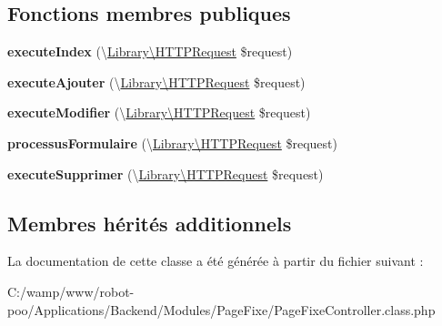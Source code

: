 \subsection*{Fonctions membres publiques}
\begin{DoxyCompactItemize}
\item 
\hypertarget{class_applications_1_1_backend_1_1_modules_1_1_page_fixe_1_1_page_fixe_controller_ac9c6fe801e9ac09e4a395ad64c76ed04}{{\bfseries execute\+Index} (\textbackslash{}\hyperlink{class_library_1_1_h_t_t_p_request}{Library\textbackslash{}\+H\+T\+T\+P\+Request} \$request)}\label{class_applications_1_1_backend_1_1_modules_1_1_page_fixe_1_1_page_fixe_controller_ac9c6fe801e9ac09e4a395ad64c76ed04}

\item 
\hypertarget{class_applications_1_1_backend_1_1_modules_1_1_page_fixe_1_1_page_fixe_controller_adf056b6997127e682bbd4ae668d0a247}{{\bfseries execute\+Ajouter} (\textbackslash{}\hyperlink{class_library_1_1_h_t_t_p_request}{Library\textbackslash{}\+H\+T\+T\+P\+Request} \$request)}\label{class_applications_1_1_backend_1_1_modules_1_1_page_fixe_1_1_page_fixe_controller_adf056b6997127e682bbd4ae668d0a247}

\item 
\hypertarget{class_applications_1_1_backend_1_1_modules_1_1_page_fixe_1_1_page_fixe_controller_ae86ff917aafe384e7fb46673719cba62}{{\bfseries execute\+Modifier} (\textbackslash{}\hyperlink{class_library_1_1_h_t_t_p_request}{Library\textbackslash{}\+H\+T\+T\+P\+Request} \$request)}\label{class_applications_1_1_backend_1_1_modules_1_1_page_fixe_1_1_page_fixe_controller_ae86ff917aafe384e7fb46673719cba62}

\item 
\hypertarget{class_applications_1_1_backend_1_1_modules_1_1_page_fixe_1_1_page_fixe_controller_a8e3be54836a0615d184b6e518218bda5}{{\bfseries processus\+Formulaire} (\textbackslash{}\hyperlink{class_library_1_1_h_t_t_p_request}{Library\textbackslash{}\+H\+T\+T\+P\+Request} \$request)}\label{class_applications_1_1_backend_1_1_modules_1_1_page_fixe_1_1_page_fixe_controller_a8e3be54836a0615d184b6e518218bda5}

\item 
\hypertarget{class_applications_1_1_backend_1_1_modules_1_1_page_fixe_1_1_page_fixe_controller_a6bb898240e821bbbb62bf86cb12a1bc2}{{\bfseries execute\+Supprimer} (\textbackslash{}\hyperlink{class_library_1_1_h_t_t_p_request}{Library\textbackslash{}\+H\+T\+T\+P\+Request} \$request)}\label{class_applications_1_1_backend_1_1_modules_1_1_page_fixe_1_1_page_fixe_controller_a6bb898240e821bbbb62bf86cb12a1bc2}

\end{DoxyCompactItemize}
\subsection*{Membres hérités additionnels}


La documentation de cette classe a été générée à partir du fichier suivant \+:\begin{DoxyCompactItemize}
\item 
C\+:/wamp/www/robot-\/poo/\+Applications/\+Backend/\+Modules/\+Page\+Fixe/Page\+Fixe\+Controller.\+class.\+php\end{DoxyCompactItemize}

